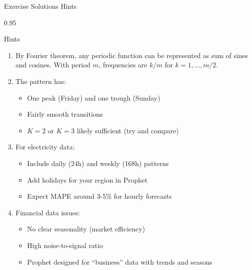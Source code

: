 \documentclass[9pt, aspectratio=169, t]{beamer}
\begin{document}
\begin{frame}{Exercise Solutions Hints}
    \begin{cminipage}{0.95\textwidth}
    \vspace{-0.3cm}
    {\footnotesize
    \begin{block}{Hints}
        \begin{enumerate}\setlength{\itemsep}{1pt}
            \item By Fourier theorem, any periodic function can be represented as sum of sines and cosines. With period $m$, frequencies are $k/m$ for $k = 1, \ldots, m/2$.

            \item The pattern has:
                \begin{itemize}\setlength{\itemsep}{0pt}
                    \item One peak (Friday) and one trough (Sunday)
                    \item Fairly smooth transitions
                    \item $K=2$ or $K=3$ likely sufficient (try and compare)
                \end{itemize}

            \item For electricity data:
                \begin{itemize}\setlength{\itemsep}{0pt}
                    \item Include daily (24h) and weekly (168h) patterns
                    \item Add holidays for your region in Prophet
                    \item Expect MAPE around 3-5\% for hourly forecasts
                \end{itemize}

            \item Financial data issues:
                \begin{itemize}\setlength{\itemsep}{0pt}
                    \item No clear seasonality (market efficiency)
                    \item High noise-to-signal ratio
                    \item Prophet designed for ``business'' data with trends and seasons
                \end{itemize}
        \end{enumerate}
    \end{block}
    }
    \end{cminipage}
\end{frame}
\end{document}
